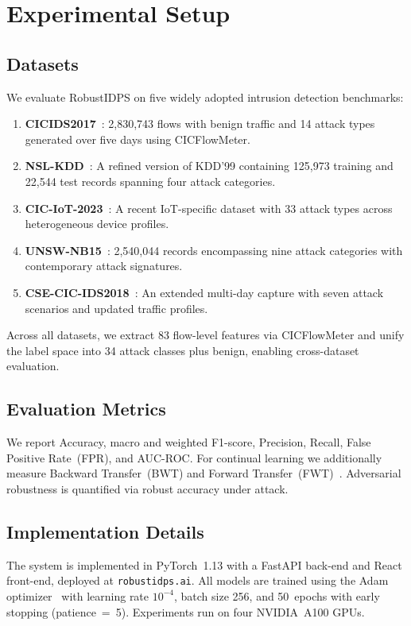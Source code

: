 \documentclass[journal,twoside]{IEEEtran}
\begin{document}
\section{Experimental Setup}
\label{sec:experimental_setup}

\subsection{Datasets}
We evaluate RobustIDPS on five widely adopted intrusion detection benchmarks:

\begin{enumerate}
    \item \textbf{CICIDS2017}~\cite{Sharafaldin2018}: 2,830,743 flows with benign traffic and 14 attack types generated over five days using CICFlowMeter.
    \item \textbf{NSL-KDD}~\cite{Tavallaee2009}: A refined version of KDD'99 containing 125,973 training and 22,544 test records spanning four attack categories.
    \item \textbf{CIC-IoT-2023}~\cite{Neto2023}: A recent IoT-specific dataset with 33 attack types across heterogeneous device profiles.
    \item \textbf{UNSW-NB15}~\cite{Moustafa2015}: 2,540,044 records encompassing nine attack categories with contemporary attack signatures.
    \item \textbf{CSE-CIC-IDS2018}~\cite{CSEIDS2018}: An extended multi-day capture with seven attack scenarios and updated traffic profiles.
\end{enumerate}

Across all datasets, we extract 83 flow-level features via CICFlowMeter and unify the label space into 34 attack classes plus benign, enabling cross-dataset evaluation.

\subsection{Evaluation Metrics}
We report Accuracy, macro and weighted F1-score, Precision, Recall, False Positive Rate~(FPR), and AUC-ROC. For continual learning we additionally measure Backward Transfer~(BWT) and Forward Transfer~(FWT)~\cite{Lopez-Paz2017}. Adversarial robustness is quantified via robust accuracy under attack.

\subsection{Implementation Details}
The system is implemented in PyTorch~1.13 with a FastAPI back-end and React front-end, deployed at \texttt{robustidps.ai}. All models are trained using the Adam optimizer~\cite{Kingma2015} with learning rate $10^{-4}$, batch size 256, and 50~epochs with early stopping (patience~=~5). Experiments run on four NVIDIA~A100 GPUs.
\end{document}

